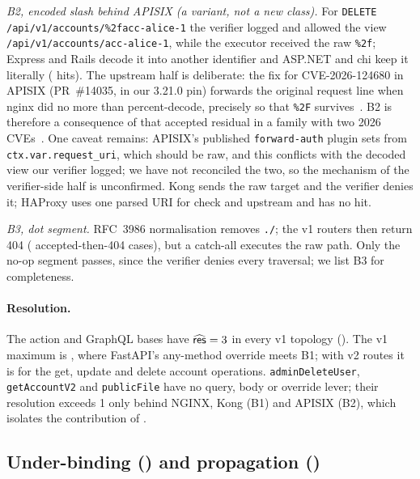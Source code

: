 \emph{B2, encoded slash behind APISIX (a variant, not a new class).} For
\texttt{DELETE /api/v1/accounts/\%2facc-alice-1} the verifier logged and
allowed the view \texttt{/api/v1/accounts/acc-alice-1}, while the executor
received the raw \texttt{\%2f}; Express and Rails decode it into another
identifier and ASP.NET and chi keep it literally (\NumHitsApisixPct{} hits).
The upstream half is deliberate: the fix for CVE-2026-124680 in APISIX
(PR~\#14035, in our 3.21.0 pin) forwards the original request line when
nginx did no more than percent-decode, precisely so that \texttt{\%2F}
survives~\cite{p2:apisix2026_124680}. B2 is therefore a consequence of that
accepted residual in a family with two 2026
CVEs~\cite{p2:apisix2026_94269,p2:apisix2026_124680}. One caveat remains:
APISIX's published \texttt{forward-auth} plugin sets 
from \texttt{ctx.var.request\_uri}, which should be raw, and this conflicts
with the decoded view our verifier logged; we have not reconciled the two, so
the mechanism of the verifier-side half is unconfirmed. Kong sends the raw
target and the verifier denies it; HAProxy uses one parsed URI for check and
upstream and has no \GB hit.

\emph{B3, dot segment.} RFC~3986 normalisation removes \texttt{./}; the v1
routers then return 404 (\NumLatentDot{} accepted-then-404 cases), but a
catch-all executes the raw path. Only the no-op segment passes, since the
verifier denies every traversal; we list B3 for completeness.

\paragraph{Resolution.} The action and GraphQL bases have $\widehat{\mathsf{res}}=3$ in
every v1 topology (\GA). The v1 maximum is \MaxResolutionVOne{}, where
FastAPI's any-method override meets B1; with v2 routes it is
\MaxResolution{} for the get, update and delete account operations. \texttt{adminDeleteUser}, \texttt{getAccountV2} and
\texttt{publicFile} have no query, body or override lever; their resolution
exceeds 1 only behind NGINX, Kong (B1) and APISIX (B2), which isolates the
contribution of \GB.

\subsection{Under-binding (\GA) and propagation (\GC)}

